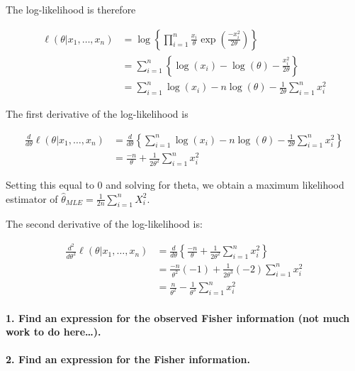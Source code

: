 \documentclass[]{article}
\let\oldparagraph\paragraph
\renewcommand{\paragraph}[1]{\oldparagraph{#1}\mbox{}}
\begin{document}
The log-likelihood is therefore

\begin{align*}
\ell(\theta | x_1, \ldots, x_n) &= \log\left\{ \prod_{i=1}^n \frac{x_i}{\theta} \exp \left( \frac{-x_i^2}{2 \theta} \right) \right\} \\
 &= \sum_{i=1}^n \left\{ \log(x_i) - \log(\theta) - \frac{x_i^2}{2 \theta} \right\} \\
 &= \sum_{i=1}^n \log(x_i) - n \log(\theta) - \frac{1}{2 \theta} \sum_{i=1}^n x_i^2
\end{align*}

\newpage

The first derivative of the log-likelihood is

\begin{align*}
\frac{d}{d \theta} \ell(\theta | x_1, \ldots, x_n) &= \frac{d}{d \theta} \left\{ \sum_{i=1}^n \log(x_i) - n \log(\theta) - \frac{1}{2\theta} \sum_{i=1}^n x_i^2 \right\} \\
&= \frac{-n}{\theta} + \frac{1}{2\theta^2} \sum_{i=1}^n x_i^2
\end{align*}

Setting this equal to 0 and solving for theta, we obtain a maximum
likelihood estimator of
\(\hat{\theta}_{MLE} = \frac{1}{2n} \sum_{i=1}^n X_{i}^2\).

The second derivative of the log-likelihood is:

\begin{align*}
\frac{d^2}{d \theta^2} \ell(\theta | x_1, \ldots, x_n) &= \frac{d}{d \theta} \left\{ \frac{-n}{\theta} + \frac{1}{2\theta^2} \sum_{i=1}^n x_i^2 \right\} \\
&= \frac{-n}{\theta^2}(-1) + \frac{1}{2\theta^3} (-2) \sum_{i=1}^n x_i^2 \\
&= \frac{n}{\theta^2} - \frac{1}{\theta^3} \sum_{i=1}^n x_i^2
\end{align*}

\paragraph{1. Find an expression for the observed Fisher information
(not much work to do
here\ldots{}).}\label{find-an-expression-for-the-observed-fisher-information-not-much-work-to-do-here.}

\vspace{3cm}

\paragraph{2. Find an expression for the Fisher
information.}\label{find-an-expression-for-the-fisher-information.}
\end{document}
